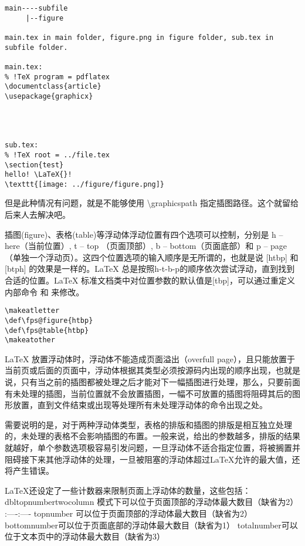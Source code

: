 \begin{verbatim}
main----subfile
     |--figure

main.tex in main folder, figure.png in figure folder, sub.tex in subfile folder.

main.tex:
% !TeX program = pdflatex
\documentclass{article}
\usepackage{graphicx}

  


sub.tex:
% !TeX root = ../file.tex
\section{test}
hello! \LaTeX{}!
\texttt{[image: ../figure/figure.png]}
\end{verbatim}

但是此种情况有问题，就是不能够使用 \textbackslash{}graphicspath
指定插图路径。这个就留给后来人去解决吧。



插图(figure)、表格(table)等浮动体浮动位置有四个选项可以控制，分别是 h --
here（当前位置）, t -- top （页面顶部）, b -- bottom（页面底部）和 p --
page（单独一个浮动页）。这四个位置选项的输入顺序是无所谓的，也就是说
{[}htbp{]} 和 {[}btph{]} 的效果是一样的。LaTeX
总是按照h-t-b-p的顺序依次尝试浮动，直到找到合适的位置。LaTeX
标准文档类中对位置参数的默认值是{[}tbp{]}，可以通过重定义内部命令
 和 来修改。

\begin{verbatim}
\makeatletter
\def\fps@figure{htbp}
\def\fps@table{htbp}
\makeatother
\end{verbatim}

LaTeX 放置浮动体时，浮动体不能造成页面溢出（overfull
page），且只能放置于当前页或后面的页面中，浮动体根据其类型必须按源码内出现的顺序出现，也就是说，只有当之前的插图都被处理之后才能对下一幅插图进行处理，那么，只要前面有未处理的插图，当前位置就不会放置插图，一幅不可放置的插图将阻碍其后的图形放置，直到文件结束或出现\clearpage 等处理所有未处理浮动体的命令出现之处。

需要说明的是，对于两种浮动体类型，表格的排版和插图的排版是相互独立处理的，未处理的表格不会影响插图的布置。一般来说，给出的参数越多，排版的结果就越好，单个参数选项极容易引发问题，一旦浮动体不适合指定位置，将被搁置并阻碍接下来其他浮动体的处理，一旦被阻塞的浮动体超过LaTeX允许的最大值，还将产生错误。

LaTeX还设定了一些计数器来限制页面上浮动体的数量，这些包括：
dbltopnumber\textbar{}twocolumn
模式下可以位于页面顶部的浮动体最大数目（缺省为2）\textbar{}
:----\textbar{}:----\textbar{} topnumber
\textbar{}可以位于页面顶部的浮动体最大数目（缺省为2）\textbar{}
bottomnumber\textbar{}可以位于页面底部的浮动体最大数目（缺省为1）\textbar{}
totalnumber\textbar{}可以位于文本页中的浮动体最大数目（缺省为3）\textbar{}

